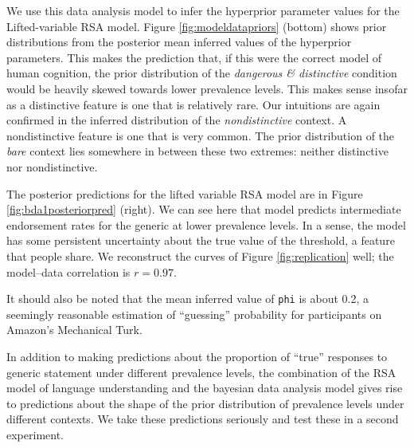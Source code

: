 \documentclass[10pt,letterpaper]{article}
\begin{document}

We use this data analysis model to infer the hyperprior parameter values for the Lifted-variable RSA model. Figure \ref{fig:modeldatapriors} (bottom) shows prior distributions from the posterior mean inferred values of the hyperprior parameters. This makes the prediction that, if this were the correct model of human cognition, the prior distribution of the \emph{dangerous \& distinctive} condition would be heavily skewed towards lower prevalence levels. This makes sense insofar as a distinctive feature is one that is relatively rare. Our intuitions are again confirmed in the inferred distribution of the \emph{nondistinctive} context. A nondistinctive feature is one that is very common. The prior distribution of the \emph{bare} context lies somewhere in between these two extremes: neither distinctive nor nondistinctive.

The posterior predictions for the lifted variable RSA model are in Figure \ref{fig:bda1posteriorpred} (right). We can see here that model predicts intermediate endorsement rates for the generic at lower prevalence levels. In a sense, the model has some persistent uncertainty about the true value of the threshold, a feature that people share. We reconstruct the curves of Figure \ref{fig:replication} well; the model--data correlation is $r = 0.97$.

It should also be noted that the mean inferred value of  \lstinline{phi} is about 0.2, a seemingly reasonable estimation of ``guessing'' probability for participants on Amazon's Mechanical Turk.


In addition to making predictions about the proportion of ``true'' responses to generic statement under different prevalence levels, the combination of the RSA model of language understanding and the bayesian data analysis model gives rise to predictions about the shape of the prior distribution of prevalence levels under different contexts. We take these predictions seriously and test these in a second experiment. 
\end{document}

